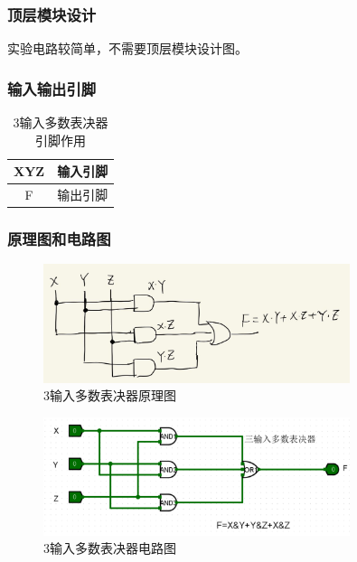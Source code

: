 \documentclass{article}
\begin{document}
    \subsubsection{顶层模块设计}
    实验电路较简单，不需要顶层模块设计图。

    \subsubsection{输入输出引脚}
    \begin{table}[H]
    \centering
    \begin{tabular}{|c|c|}
        \hline
        XYZ & 输入引脚 \\ \hline
        F   & 输出引脚 \\ \hline
    \end{tabular}
    \caption{3输入多数表决器引脚作用}
    \end{table}

    \subsubsection{原理图和电路图}
    \begin{figure}[H]
    \centering
    \includegraphics[width=0.8\textwidth]{1.3.png}
    \caption{3输入多数表决器原理图}
    \end{figure}

    \begin{figure}[H]
    \centering
    \includegraphics[width=0.8\textwidth]{1.2.png}
    \caption{3输入多数表决器电路图}
    \end{figure}
\end{document}
